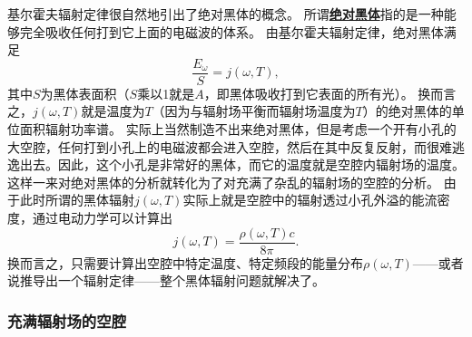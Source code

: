 \documentclass[UTF8, a4paper]{ctexart}
\newcommand{\concept}[1]{\underline{\textbf{#1}}}
\begin{document}
基尔霍夫辐射定律很自然地引出了绝对黑体的概念。
所谓\concept{绝对黑体}指的是一种能够完全吸收任何打到它上面的电磁波的体系。
由基尔霍夫辐射定律，绝对黑体满足
\begin{equation}
    \frac{E_\omega}{S} = j(\omega, T),
\end{equation}
其中$S$为黑体表面积（$S$乘以1就是$A$，即黑体吸收打到它表面的所有光）。
换而言之，$j(\omega, T)$就是温度为$T$（因为与辐射场平衡而辐射场温度为$T$）的绝对黑体的单位面积辐射功率谱。
实际上当然制造不出来绝对黑体，但是考虑一个开有小孔的大空腔，任何打到小孔上的电磁波都会进入空腔，然后在其中反复反射，而很难逃逸出去。因此，这个小孔是非常好的黑体，而它的温度就是空腔内辐射场的温度。
这样一来对绝对黑体的分析就转化为了对充满了杂乱的辐射场的空腔的分析。
由于此时所谓的黑体辐射$j(\omega, T)$实际上就是空腔中的辐射透过小孔外溢的能流密度，通过电动力学可以计算出
\begin{equation}
    j(\omega, T) = \frac{\rho(\omega, T) c}{8 \pi}.
\end{equation}
换而言之，只需要计算出空腔中特定温度、特定频段的能量分布$\rho(\omega, T)$——或者说推导出一个辐射定律——整个黑体辐射问题就解决了。

\subsubsection{充满辐射场的空腔}
\end{document}
